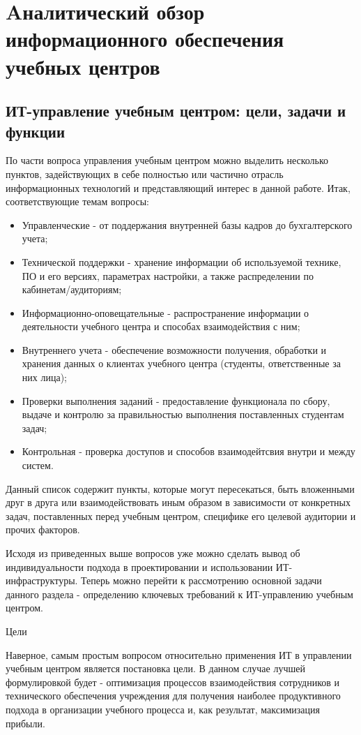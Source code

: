 \section{Aналитический обзор информационного обеспечения учебных центров}
\subsection{ИТ-управление учебным центром: цели, задачи и функции}
По части вопроса управления учебным центром можно выделить несколько пунктов, задействующих в себе полностью или частично отрасль информационных технологий и представляющий интерес в данной работе.
Итак, соответствующие темам вопросы:
\begin{itemize}
    \item Управленческие - от поддержания внутренней базы кадров до бухгалтерского учета;
    \item Технической поддержки - хранение информации об используемой технике, ПО и его версиях, параметрах настройки, а также распределении по кабинетам/аудиториям;
    \item Информационно-оповещательные - распространение информации о деятельности учебного центра и способах взаимодействия с ним;
    \item Внутреннего учета - обеспечение возможности получения, обработки и хранения данных о клиентах учебного центра (студенты, ответственные за них лица);
    \item Проверки выполнения заданий - предоставление функционала по сбору, выдаче и контролю за правильностью выполнения поставленных студентам задач;
    \item Контрольная - проверка доступов и способов взаимодейтсвия внутри и между систем.
\end{itemize}

Данный список содержит пункты, которые могут пересекаться, быть вложенными друг в друга или взаимодействовать иным образом в зависимости от конкретных задач, поставленных перед учебным центром, специфике его целевой аудитории и прочих факторов.

Исходя из приведенных выше вопросов уже можно сделать вывод об индивидуальности подхода в проектировании и использовании ИТ-инфраструктуры.
Теперь можно перейти к рассмотрению основной задачи данного раздела - определению ключевых требований к ИТ-управлению учебным центром.

Цели

Наверное, самым простым вопросом относительно применения ИТ в управлении учебным центром является постановка цели.
В данном случае лучшей формулировкой будет - оптимизация процессов взаимодействия сотрудников и технического обеспечения учреждения для получения наиболее продуктивного подхода в организации учебного процесса и, как результат, максимизация прибыли.

